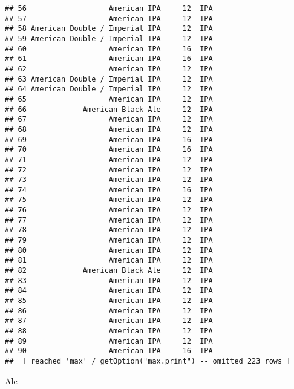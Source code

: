 \documentclass[
]{article}
\newenvironment{Shaded}{\begin{snugshade}}{\end{snugshade}}
\newcommand{\NormalTok}[1]{#1}
\begin{document}
\begin{verbatim}
## 56                   American IPA     12  IPA
## 57                   American IPA     12  IPA
## 58 American Double / Imperial IPA     12  IPA
## 59 American Double / Imperial IPA     12  IPA
## 60                   American IPA     16  IPA
## 61                   American IPA     16  IPA
## 62                   American IPA     12  IPA
## 63 American Double / Imperial IPA     12  IPA
## 64 American Double / Imperial IPA     12  IPA
## 65                   American IPA     12  IPA
## 66             American Black Ale     12  IPA
## 67                   American IPA     12  IPA
## 68                   American IPA     12  IPA
## 69                   American IPA     16  IPA
## 70                   American IPA     16  IPA
## 71                   American IPA     12  IPA
## 72                   American IPA     12  IPA
## 73                   American IPA     12  IPA
## 74                   American IPA     16  IPA
## 75                   American IPA     12  IPA
## 76                   American IPA     12  IPA
## 77                   American IPA     12  IPA
## 78                   American IPA     12  IPA
## 79                   American IPA     12  IPA
## 80                   American IPA     12  IPA
## 81                   American IPA     12  IPA
## 82             American Black Ale     12  IPA
## 83                   American IPA     12  IPA
## 84                   American IPA     12  IPA
## 85                   American IPA     12  IPA
## 86                   American IPA     12  IPA
## 87                   American IPA     12  IPA
## 88                   American IPA     12  IPA
## 89                   American IPA     12  IPA
## 90                   American IPA     16  IPA
##  [ reached 'max' / getOption("max.print") -- omitted 223 rows ]
\end{verbatim}

\begin{Shaded}
\begin{Highlighting}[]
\NormalTok{Ale}
\end{Highlighting}
\end{Shaded}
\end{document}
